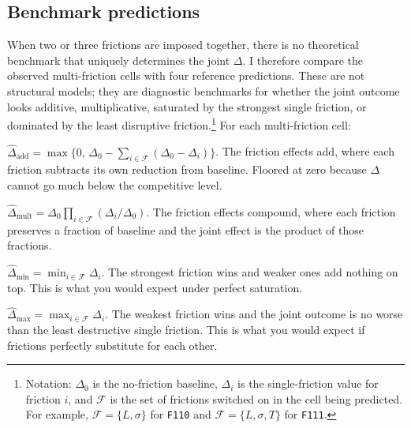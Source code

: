 \subsection{Benchmark predictions}
\label{sec:factorial-benchmarks}

When two or three frictions are imposed together, there is no theoretical benchmark that uniquely determines the joint $\Delta$. I therefore compare the observed multi-friction cells with four reference predictions. These are not structural models; they are diagnostic benchmarks for whether the joint outcome looks additive, multiplicative, saturated by the strongest single friction, or dominated by the least disruptive friction.\footnote{Notation: $\Delta_0$ is the no-friction baseline, $\Delta_i$ is the single-friction value for friction $i$, and $\mathcal{F}$ is the set of frictions switched on in the cell being predicted. For example, $\mathcal{F}=\{L,\sigma\}$ for \texttt{F110} and $\mathcal{F}=\{L,\sigma,T\}$ for \texttt{F111}.} For each multi-friction cell:
\begin{description}[leftmargin=2.4em, style=nextline]
    \item[Additive] $\widehat\Delta_{\mathrm{add}} = \max\{0,\, \Delta_0 - \sum_{i\in\mathcal{F}}(\Delta_0 - \Delta_i)\}$. The friction effects add, where each friction subtracts its own reduction from baseline. Floored at zero because $\Delta$ cannot go much below the competitive level.
    \item[Multiplicative] $\widehat\Delta_{\mathrm{mult}} = \Delta_0 \prod_{i\in\mathcal{F}}(\Delta_i/\Delta_0)$. The friction effects compound, where each friction preserves a fraction of baseline and the joint effect is the product of those fractions.
    \item[Minimum] $\widehat\Delta_{\mathrm{min}} = \min_{i\in\mathcal{F}}\Delta_i$. The strongest friction wins and weaker ones add nothing on top. This is what you would expect under perfect saturation.
    \item[Maximum] $\widehat\Delta_{\mathrm{max}} = \max_{i\in\mathcal{F}}\Delta_i$. The weakest friction wins and the joint outcome is no worse than the least destructive single friction. This is what you would expect if frictions perfectly substitute for each other.
\end{description}

